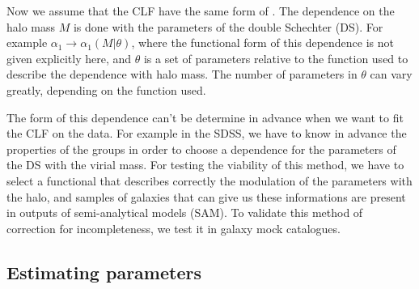 Now we assume that the CLF have the same form of . The
dependence on the halo mass $M$ is done with the parameters of the double
Schechter (DS). For example $\alpha_1\rightarrow\alpha_1\left(M|\theta\right)$,
where the functional form of this dependence is not given explicitly here, and
$\theta$ is a set of parameters relative to the function used to describe the
dependence with halo mass. The number of parameters in $\theta$ can vary
greatly, depending on the function used.

The form of this dependence can't be determine in advance when we want to fit
the CLF on the data. For example in the SDSS, we have to know in advance the
properties of the groups in order to choose a dependence for the parameters of
the DS with the virial mass. For testing the viability of this method, we have
to select a functional that describes correctly the modulation of the
parameters with the halo, and samples of galaxies that can give us these
informations are present in outputs of semi-analytical models (SAM). To
validate this method of correction for incompleteness, we test it in galaxy
mock catalogues.

\subsection{Estimating parameters}

